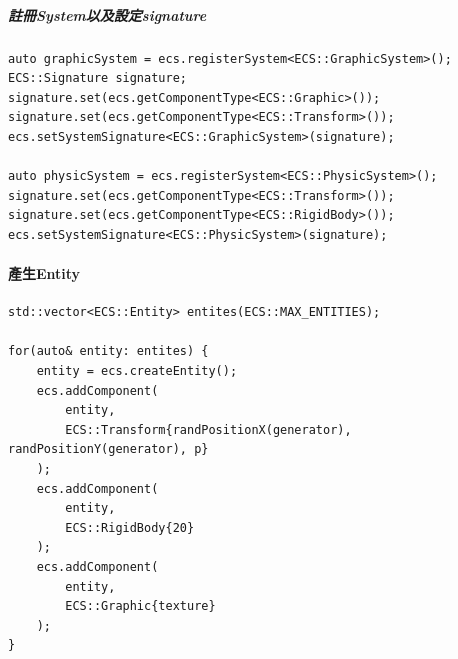 \subparagraph{註冊System以及設定signature}

\begin{lstlisting}
auto graphicSystem = ecs.registerSystem<ECS::GraphicSystem>();
ECS::Signature signature;
signature.set(ecs.getComponentType<ECS::Graphic>());
signature.set(ecs.getComponentType<ECS::Transform>());
ecs.setSystemSignature<ECS::GraphicSystem>(signature);

auto physicSystem = ecs.registerSystem<ECS::PhysicSystem>();
signature.set(ecs.getComponentType<ECS::Transform>());
signature.set(ecs.getComponentType<ECS::RigidBody>());
ecs.setSystemSignature<ECS::PhysicSystem>(signature);
\end{lstlisting}

\paragraph{產生Entity}

\begin{lstlisting}
std::vector<ECS::Entity> entites(ECS::MAX_ENTITIES);

for(auto& entity: entites) {
    entity = ecs.createEntity();
    ecs.addComponent(
        entity,
        ECS::Transform{randPositionX(generator), randPositionY(generator), p}
    );
    ecs.addComponent(
        entity,
        ECS::RigidBody{20}
    );
    ecs.addComponent(
        entity,
        ECS::Graphic{texture}
    );
}
\end{lstlisting}

